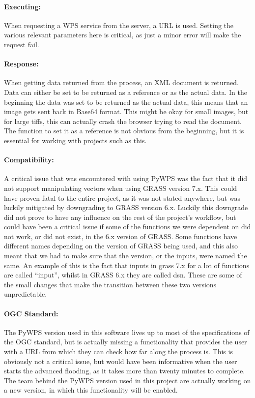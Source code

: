 \paragraph{Executing:} When requesting a WPS service from the server, a URL is used. Setting the various relevant parameters here is critical, as just a minor error will make the request fail. 

\paragraph{Response:} When getting data returned from the process, an XML document is returned. Data can either be set to be returned as a reference or as the actual data. In the beginning the data was set to be returned as the actual data, this means that an image gets sent back in Base64 format. This might be okay for small images, but for large tiffs, this can actually crash the browser trying to read the document. The function to set it as a reference is not obvious from the beginning, but it is essential for working with projects such as this.

\paragraph{Compatibility:} A critical issue that was encountered with using PyWPS was the fact that it did not support manipulating vectors when using GRASS version 7.x. This could have proven fatal to the entire project, as it was not stated anywhere, but was luckily mitigated by downgrading to GRASS version 6.x. Luckily this downgrade did not prove to have any influence on the rest of the project's workflow, but could have been a critical issue if some of the functions we were dependent on did not work, or did not exist, in the 6.x version of GRASS. 
Some functions have different names depending on the version of GRASS being used, and this also meant that we had to make sure that the version, or the inputs, were named the same. An example of this is the fact that inputs in grass 7.x for a lot of functions are called “input”, whilst in GRASS 6.x they are called dsn. These are some of the small changes that make the transition between these two versions unpredictable.

\paragraph{OGC Standard:} The PyWPS version used in this software lives up to most of the specifications of the OGC standard, but is actually missing a functionality that provides the user with a URL from which they can check how far along the process is. This is obviously not a critical issue, but would have been informative when the user starts the advanced flooding, as it takes more than twenty minutes to complete. The team behind the PyWPS version used in this project are actually working on a new version, in which this functionality will be enabled.

